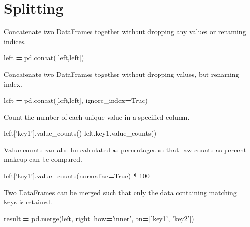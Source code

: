 \documentclass[]{book}
\newenvironment{Shaded}{\begin{snugshade}}{\end{snugshade}}
\newcommand{\DecValTok}[1]{\textcolor[rgb]{0.00,0.00,0.81}{#1}}
\newcommand{\StringTok}[1]{\textcolor[rgb]{0.31,0.60,0.02}{#1}}
\newcommand{\VariableTok}[1]{\textcolor[rgb]{0.00,0.00,0.00}{#1}}
\newcommand{\OperatorTok}[1]{\textcolor[rgb]{0.81,0.36,0.00}{\textbf{#1}}}
\newcommand{\NormalTok}[1]{#1}
\begin{document}
\section{Splitting}\label{splitting}

Concatenate two DataFrames together without dropping any values or
renaming indices.

\begin{Shaded}
\begin{Highlighting}[]
\NormalTok{left }\OperatorTok{=}\NormalTok{ pd.concat([left,left])}
\end{Highlighting}
\end{Shaded}

Concatenate two DataFrames together without dropping values, but
renaming index.

\begin{Shaded}
\begin{Highlighting}[]
\NormalTok{left }\OperatorTok{=}\NormalTok{ pd.concat([left,left], ignore_index}\OperatorTok{=}\VariableTok{True}\NormalTok{)}
\end{Highlighting}
\end{Shaded}

Count the number of each unique value in a specified column.

\begin{Shaded}
\begin{Highlighting}[]
\NormalTok{left[}\StringTok{'key1'}\NormalTok{].value_counts()}
\NormalTok{left.key1.value_counts()}
\end{Highlighting}
\end{Shaded}

Value counts can also be calculated as percentages so that raw counts as
percent makeup can be compared.

\begin{Shaded}
\begin{Highlighting}[]
\NormalTok{left[}\StringTok{'key1'}\NormalTok{].value_counts(normalize}\OperatorTok{=}\VariableTok{True}\NormalTok{) }\OperatorTok{*} \DecValTok{100}
\end{Highlighting}
\end{Shaded}

Two DataFrames can be merged such that only the data containing matching
keys is retained.

\begin{Shaded}
\begin{Highlighting}[]
\NormalTok{result }\OperatorTok{=}\NormalTok{ pd.merge(left, right, how}\OperatorTok{=}\StringTok{'inner'}\NormalTok{, on}\OperatorTok{=}\NormalTok{[}\StringTok{'key1'}\NormalTok{, }\StringTok{'key2'}\NormalTok{])}
\end{Highlighting}
\end{Shaded}
\end{document}
